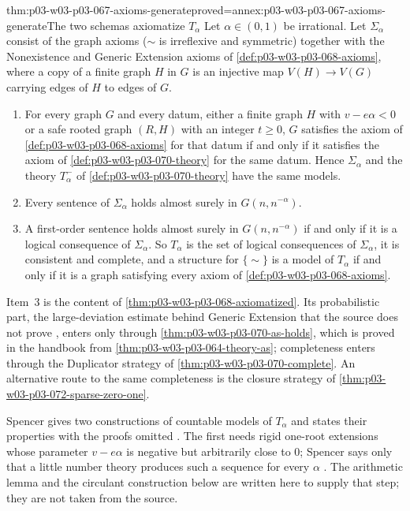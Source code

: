\begin{hblemma}{thm:p03-w03-p03-067-axioms-generate}{proved=annex:p03-w03-p03-067-axioms-generate}{The two schemas axiomatize \(T_\alpha\)}
Let \(\alpha\in(0,1)\) be irrational.  Let \(\Sigma_\alpha\) consist of the
graph axioms (\(\sim\) is irreflexive and symmetric) together with the
Nonexistence and Generic Extension axioms of
\cref{def:p03-w03-p03-068-axioms}, where a copy of a finite graph \(H\) in
\(G\) is an injective map \(V(H)\to V(G)\) carrying edges of \(H\) to edges
of \(G\).
\begin{enumerate}
\item For every graph \(G\) and every datum, either a finite graph \(H\) with
  \(v-e\alpha<0\) or a safe rooted graph \((R,H)\) with an integer
  \(t\geq0\), \(G\) satisfies the axiom of
  \cref{def:p03-w03-p03-068-axioms} for that datum if and only if it
  satisfies the axiom of \cref{def:p03-w03-p03-070-theory} for the same
  datum.  Hence \(\Sigma_\alpha\) and the theory \(T^-_\alpha\) of
  \cref{def:p03-w03-p03-070-theory} have the same models.
\item Every sentence of \(\Sigma_\alpha\) holds almost surely in
  \(G(n,n^{-\alpha})\).
\item A first-order sentence holds almost surely in \(G(n,n^{-\alpha})\) if
  and only if it is a logical consequence of \(\Sigma_\alpha\).  So
  \(T_\alpha\) is the set of logical consequences of \(\Sigma_\alpha\), it is
  consistent and complete, and a structure for \(\{\sim\}\) is a model of
  \(T_\alpha\) if and only if it is a graph satisfying every axiom of
  \cref{def:p03-w03-p03-068-axioms}.
\end{enumerate}
\end{hblemma}

Item~3 is the content of \cref{thm:p03-w03-p03-068-axiomatized}.  Its
probabilistic part, the large-deviation estimate behind Generic Extension
that the source does not prove
\cite[pp.~10--11]{Spencer2007LogicRandomStructuresAuthor}, enters only
through \cref{thm:p03-w03-p03-070-as-holds}, which is proved in the handbook
from \cref{thm:p03-w03-p03-064-theory-as}; completeness enters through the
Duplicator strategy of \cref{thm:p03-w03-p03-070-complete}.  An alternative
route to the same completeness is the closure strategy of
\cref{thm:p03-w03-p03-072-sparse-zero-one}.

Spencer gives two constructions of countable models of \(T_\alpha\) and
states their properties with the proofs omitted
\cite[pp.~14--15]{Spencer2007LogicRandomStructuresAuthor}.  The first needs
rigid one-root extensions whose parameter \(v-e\alpha\) is negative but
arbitrarily close to \(0\); Spencer says only that a little number theory
produces such a sequence for every \(\alpha\)
\cite[p.~14]{Spencer2007LogicRandomStructuresAuthor}.  The arithmetic lemma
and the circulant construction below are written here to supply that step;
they are not taken from the source.

